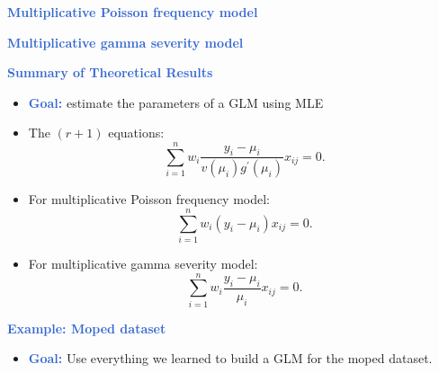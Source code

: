 \documentclass[aspectratio=169,professionalfonts,mathserif,handout]{beamer}
\newcommand{\highlight}[1]{\textcolor{Highlight}{\bf #1}}
\renewcommand{\(}{\left(}
\renewcommand{\)}{\right)}
\renewcommand{\[}{\left[}
\renewcommand{\]}{\right]}
\newcommand{\mytitle}[1]{\vspace*{-1mm}%
  \centerline{\highlight{\Large #1}}\vspace*{3mm}}
\newenvironment{slidebox}{%
  \begin{minipage}[c][7.5cm][t]{14.4cm}\raggedright}{%
  \end{minipage}}
\begin{document}
\begin{frame}\begin{slidebox}
\mytitle{Multiplicative Poisson frequency model}

\end{slidebox}\end{frame}


\begin{frame}\begin{slidebox}
\mytitle{Multiplicative gamma severity model}

\end{slidebox}\end{frame}


\begin{frame}\begin{slidebox}
\mytitle{Summary of Theoretical Results}
\begin{itemize}
    \item \highlight{Goal:} estimate the parameters of a GLM using MLE
    \pause
    \item The $(r+1)$ equations:
    \begin{equation*}
      \sum_{i=1}^{n}w_{i}\frac{y_{i}-\mu_{i}}{v\left(  \mu_{i}\right)  g^{\prime
      }\left(  \mu_{i}\right)  }x_{ij}=0\text{.} 
    \end{equation*}
    \pause
    \item For multiplicative Poisson frequency model:
    \begin{equation*}
      \sum_{i=1}^{n}w_{i} (y_{i}-\mu_{i}) x_{ij} = 0 \text{.}
    \end{equation*}  
    \pause
    \item For multiplicative gamma severity model:
    \begin{equation*}
      \sum_{i=1}^{n}w_{i}\frac{y_{i}-\mu_{i}}{\mu_{i}}x_{ij}=0\text{.} 
    \end{equation*}
\end{itemize}
\end{slidebox}\end{frame}

\begin{frame}\begin{slidebox}
  \mytitle{Example: Moped dataset}
  
  \begin{itemize}
      \item \highlight{Goal:} Use everything we learned to build a GLM for the moped dataset.
  \end{itemize}
  \end{slidebox}\end{frame}
\end{document}
